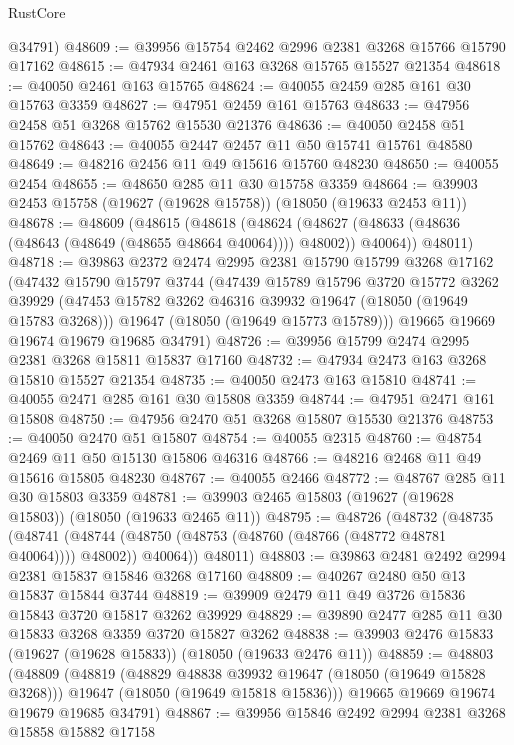 \begin{lexlean}{RustCore}
\begin{coremodule}
      @34791)
@48609 := @39956 @15754 @2462 @2996 @2381 @3268 @15766 @15790 @17162
@48615 := @47934 @2461 @163 @3268 @15765 @15527 @21354
@48618 := @40050 @2461 @163 @15765
@48624 := @40055 @2459 @285 @161 @30 @15763 @3359
@48627 := @47951 @2459 @161 @15763
@48633 := @47956 @2458 @51 @3268 @15762 @15530 @21376
@48636 := @40050 @2458 @51 @15762
@48643 := @40055 @2447 @2457 @11 @50 @15741 @15761 @48580
@48649 := @48216 @2456 @11 @49 @15616 @15760 @48230
@48650 := @40055 @2454
@48655 := @48650 @285 @11 @30 @15758 @3359
@48664 := @39903 @2453 @15758 (@19627 (@19628 @15758)) (@18050 (@19633 @2453 @11))
@48678 := @48609
    (@48615
      (@48618
        (@48624 (@48627 (@48633 (@48636 (@48643 (@48649 (@48655 @48664 @40064)))) @48002)) @40064))
      @48011)
@48718 := @39863
    @2372
    @2474
    @2995
    @2381
    @15790
    @15799
    @3268
    @17162
    (@47432
      @15790
      @15797
      @3744
      (@47439
        @15789
        @15796
        @3720
        @15772
        @3262
        @39929
        (@47453 @15782 @3262 @46316 @39932 @19647 (@18050 (@19649 @15783 @3268)))
        @19647
        (@18050 (@19649 @15773 @15789)))
      @19665
      @19669
      @19674
      @19679
      @19685
      @34791)
@48726 := @39956 @15799 @2474 @2995 @2381 @3268 @15811 @15837 @17160
@48732 := @47934 @2473 @163 @3268 @15810 @15527 @21354
@48735 := @40050 @2473 @163 @15810
@48741 := @40055 @2471 @285 @161 @30 @15808 @3359
@48744 := @47951 @2471 @161 @15808
@48750 := @47956 @2470 @51 @3268 @15807 @15530 @21376
@48753 := @40050 @2470 @51 @15807
@48754 := @40055 @2315
@48760 := @48754 @2469 @11 @50 @15130 @15806 @46316
@48766 := @48216 @2468 @11 @49 @15616 @15805 @48230
@48767 := @40055 @2466
@48772 := @48767 @285 @11 @30 @15803 @3359
@48781 := @39903 @2465 @15803 (@19627 (@19628 @15803)) (@18050 (@19633 @2465 @11))
@48795 := @48726
    (@48732
      (@48735
        (@48741 (@48744 (@48750 (@48753 (@48760 (@48766 (@48772 @48781 @40064)))) @48002)) @40064))
      @48011)
@48803 := @39863 @2481 @2492 @2994 @2381 @15837 @15846 @3268 @17160
@48809 := @40267 @2480 @50 @13 @15837 @15844 @3744
@48819 := @39909 @2479 @11 @49 @3726 @15836 @15843 @3720 @15817 @3262 @39929
@48829 := @39890 @2477 @285 @11 @30 @15833 @3268 @3359 @3720 @15827 @3262
@48838 := @39903 @2476 @15833 (@19627 (@19628 @15833)) (@18050 (@19633 @2476 @11))
@48859 := @48803
    (@48809
      (@48819
        (@48829 @48838 @39932 @19647 (@18050 (@19649 @15828 @3268)))
        @19647
        (@18050 (@19649 @15818 @15836)))
      @19665
      @19669
      @19674
      @19679
      @19685
      @34791)
@48867 := @39956 @15846 @2492 @2994 @2381 @3268 @15858 @15882 @17158

\end{coremodule}
\end{lexlean}
